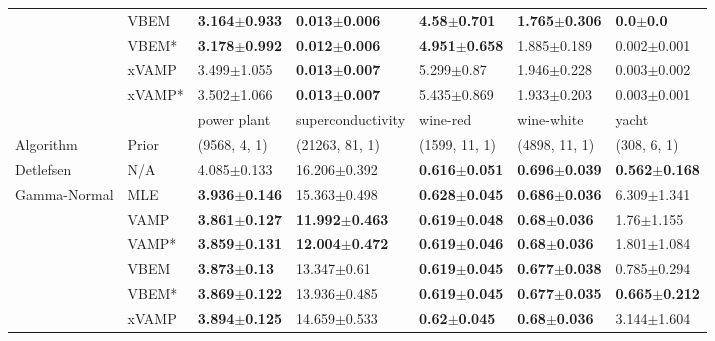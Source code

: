 \begin{tabular}{lllllll}
                 & VBEM &  \textbf{3.164$\pm$0.933} &  \textbf{0.013$\pm$0.006} &   \textbf{4.58$\pm$0.701} &  \textbf{1.765$\pm$0.306} &  \textbf{0.0$\pm$0.0} \\
                 & VBEM* &  \textbf{3.178$\pm$0.992} &  \textbf{0.012$\pm$0.006} &  \textbf{4.951$\pm$0.658} &           1.885$\pm$0.189 &       0.002$\pm$0.001 \\
                 & xVAMP &           3.499$\pm$1.055 &  \textbf{0.013$\pm$0.007} &            5.299$\pm$0.87 &           1.946$\pm$0.228 &       0.003$\pm$0.002 \\
                 & xVAMP* &           3.502$\pm$1.066 &  \textbf{0.013$\pm$0.007} &           5.435$\pm$0.869 &           1.933$\pm$0.203 &       0.003$\pm$0.001 \\
\midrule
                 &        &               power plant &          superconductivity &                  wine-red &                wine-white &                     yacht \\
Algorithm & Prior& (9568, 4, 1)& (21263, 81, 1)& (1599, 11, 1)& (4898, 11, 1)& (308, 6, 1)\\
\midrule
Detlefsen & N/A &           4.085$\pm$0.133 &           16.206$\pm$0.392 &  \textbf{0.616$\pm$0.051} &  \textbf{0.696$\pm$0.039} &  \textbf{0.562$\pm$0.168} \\
Gamma-Normal & MLE &  \textbf{3.936$\pm$0.146} &           15.363$\pm$0.498 &  \textbf{0.628$\pm$0.045} &  \textbf{0.686$\pm$0.036} &           6.309$\pm$1.341 \\
                 & VAMP &  \textbf{3.861$\pm$0.127} &  \textbf{11.992$\pm$0.463} &  \textbf{0.619$\pm$0.048} &   \textbf{0.68$\pm$0.036} &            1.76$\pm$1.155 \\
                 & VAMP* &  \textbf{3.859$\pm$0.131} &  \textbf{12.004$\pm$0.472} &  \textbf{0.619$\pm$0.046} &   \textbf{0.68$\pm$0.036} &           1.801$\pm$1.084 \\
                 & VBEM &   \textbf{3.873$\pm$0.13} &            13.347$\pm$0.61 &  \textbf{0.619$\pm$0.045} &  \textbf{0.677$\pm$0.038} &           0.785$\pm$0.294 \\
                 & VBEM* &  \textbf{3.869$\pm$0.122} &           13.936$\pm$0.485 &  \textbf{0.619$\pm$0.045} &  \textbf{0.677$\pm$0.035} &  \textbf{0.665$\pm$0.212} \\
                 & xVAMP &  \textbf{3.894$\pm$0.125} &           14.659$\pm$0.533 &   \textbf{0.62$\pm$0.045} &   \textbf{0.68$\pm$0.036} &           3.144$\pm$1.604 \\

\end{tabular}
